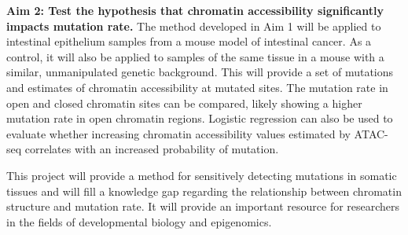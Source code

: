 \textbf{Aim 2: Test the hypothesis that chromatin accessibility significantly impacts mutation rate.}
The method developed in Aim 1 will be applied to intestinal epithelium samples from a mouse model of intestinal cancer.
As a control, it will also be applied to samples of the same tissue in a mouse with a similar, unmanipulated genetic background.
This will provide a set of mutations and estimates of chromatin accessibility at mutated sites. The mutation rate in open and closed chromatin sites can be compared, likely showing a higher mutation rate in open chromatin regions.
Logistic regression can also be used to evaluate whether increasing chromatin accessibility values estimated by ATAC-seq correlates with an increased probability of mutation.

This project will provide a method for sensitively detecting  mutations in somatic tissues and will fill a knowledge gap regarding the relationship between chromatin structure and mutation rate. It will provide an important resource for researchers in the fields of developmental biology and epigenomics.
